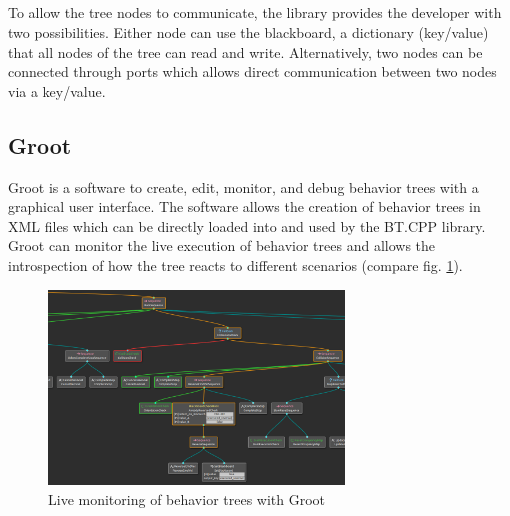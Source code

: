 \subparagraph*{}
To allow the tree nodes to communicate, the library provides the developer with two possibilities. Either node can use the blackboard, a dictionary (key/value) that all nodes of the tree can read and write. Alternatively, two nodes can be connected through ports which allows direct communication between two nodes via a key/value.

\subsection{Groot}

Groot is a software to create, edit, monitor, and debug behavior trees with a graphical user interface. The software allows the creation of behavior trees in XML files which can be directly loaded into and used by the BT.CPP library. Groot can monitor the live execution of behavior trees and allows the introspection of how the tree reacts to different scenarios (compare fig. \ref{fig:groot}).

\begin{center}
	\begin{figure}[ht]   
		\includegraphics[width=0.7\textwidth]{images/groot.png}
		\caption{Live monitoring of behavior trees with Groot}
		\label{fig:groot}
	\end{figure}
\end{center}


